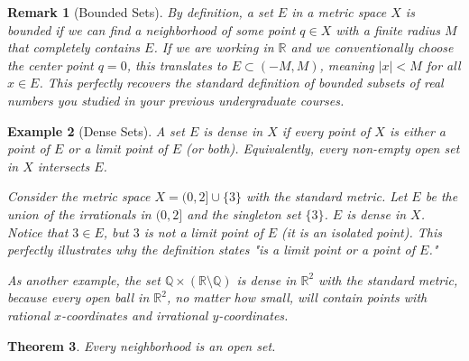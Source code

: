 \documentclass{article}
\theoremstyle{mythm}
\newtheorem{theorem}{Theorem}[section]
\newtheorem{remark}[theorem]{Remark}
\newtheorem{example}[theorem]{Example}
\begin{document}
\begin{remark}[Bounded Sets]
By definition, a set $E$ in a metric space $X$ is bounded if we can find a neighborhood of some point $q \in X$ with a finite radius $M$ that completely contains $E$. If we are working in $\mathbb{R}$ and we conventionally choose the center point $q = 0$, this translates to $E \subset (-M, M)$, meaning $|x| < M$ for all $x \in E$. This perfectly recovers the standard definition of bounded subsets of real numbers you studied in your previous undergraduate courses.
\end{remark}

\begin{example}[Dense Sets]
A set $E$ is dense in $X$ if every point of $X$ is either a point of $E$ or a limit point of $E$ (or both). Equivalently, every non-empty open set in $X$ intersects $E$. 

Consider the metric space $X = (0, 2] \cup \{3\}$ with the standard metric. Let $E$ be the union of the irrationals in $(0, 2]$ and the singleton set $\{3\}$. $E$ is dense in $X$. Notice that $3 \in E$, but $3$ is not a limit point of $E$ (it is an isolated point). This perfectly illustrates why the definition states "is a limit point \textit{or} a point of $E$."

As another example, the set $\mathbb{Q} \times (\mathbb{R} \setminus \mathbb{Q})$ is dense in $\mathbb{R}^2$ with the standard metric, because every open ball in $\mathbb{R}^2$, no matter how small, will contain points with rational $x$-coordinates and irrational $y$-coordinates.
\end{example}
\begin{theorem}
Every neighborhood is an open set.
\end{theorem}
\end{document}
